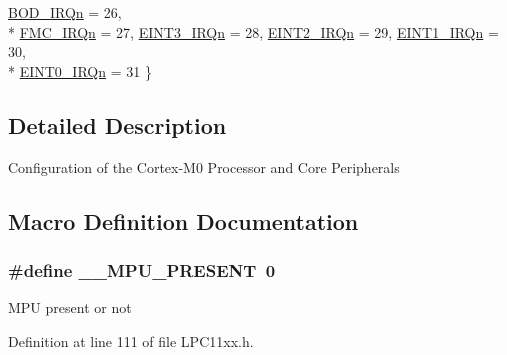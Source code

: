 \begin{DoxyCompactItemize}
\hyperlink{group___l_p_c11xx___c_m_s_i_s_gga666eb0caeb12ec0e281415592ae89083ac2ee5960aed41ff349aa7a86c37e9ab2}{B\+O\+D\+\_\+\+I\+R\+Qn} = 26, 
\\*
\hyperlink{group___l_p_c11xx___c_m_s_i_s_gga666eb0caeb12ec0e281415592ae89083ab58dc79a081058857f73965f5305479b}{F\+M\+C\+\_\+\+I\+R\+Qn} = 27, 
\hyperlink{group___l_p_c11xx___c_m_s_i_s_gga666eb0caeb12ec0e281415592ae89083a14098dd2e0d0331c1e5f1f80dde14371}{E\+I\+N\+T3\+\_\+\+I\+R\+Qn} = 28, 
\hyperlink{group___l_p_c11xx___c_m_s_i_s_gga666eb0caeb12ec0e281415592ae89083a40ab356422a691418668d6bbfd9f17b9}{E\+I\+N\+T2\+\_\+\+I\+R\+Qn} = 29, 
\hyperlink{group___l_p_c11xx___c_m_s_i_s_gga666eb0caeb12ec0e281415592ae89083ad855ae101e21a04054a9844066900d7c}{E\+I\+N\+T1\+\_\+\+I\+R\+Qn} = 30, 
\\*
\hyperlink{group___l_p_c11xx___c_m_s_i_s_gga666eb0caeb12ec0e281415592ae89083a0a3db3233549f012f8ecb88f0510adcf}{E\+I\+N\+T0\+\_\+\+I\+R\+Qn} = 31
 \}
\end{DoxyCompactItemize}


\subsection{Detailed Description}
Configuration of the Cortex-\/\+M0 Processor and Core Peripherals 

\subsection{Macro Definition Documentation}
\subsubsection[{\texorpdfstring{\+\_\+\+\_\+\+M\+P\+U\+\_\+\+P\+R\+E\+S\+E\+NT}{__MPU_PRESENT}}]{\setlength{\rightskip}{0pt plus 5cm}\#define \+\_\+\+\_\+\+M\+P\+U\+\_\+\+P\+R\+E\+S\+E\+NT~0}\hypertarget{group___l_p_c11xx___c_m_s_i_s_ga4127d1b31aaf336fab3d7329d117f448}{}\label{group___l_p_c11xx___c_m_s_i_s_ga4127d1b31aaf336fab3d7329d117f448}
M\+PU present or not 

Definition at line 111 of file L\+P\+C11xx.\+h.

